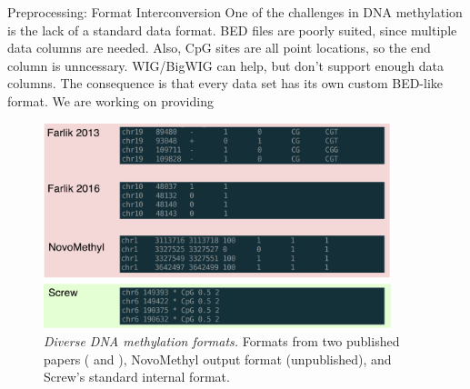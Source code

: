 \documentclass{beamer}
\begin{document}
\begin{frame}
\begin{columns}[t]
\begin{column}{.65\textwidth}
\begin{columns}[t,totalwidth=\textwidth]
\begin{column}{.48\textwidth}
\begin{block}{Preprocessing: Format Interconversion}
	One of the challenges in DNA methylation is the lack of a standard data format. BED files are poorly suited, since multiple data columns are needed. Also, CpG sites are all point locations, so the end column is unncessary. WIG/BigWIG can help, but don't support enough data columns. The consequence is that every data set has its own custom BED-like format. We are working on providing 
\begin{figure}
\begin{center}
\includegraphics[width=0.9\textwidth]{figures/data_types.pdf}
\caption{\textit{Diverse DNA methylation formats.} Formats from two published papers (\cite{Farlik2013} and \cite{Farlik2016}), NovoMethyl output format (unpublished), and Screw's standard internal format.}
\end{center}
\end{figure}

\end{block}


\end{column}
\end{columns}
\end{column}
\end{columns}
\end{frame}
\end{document}
